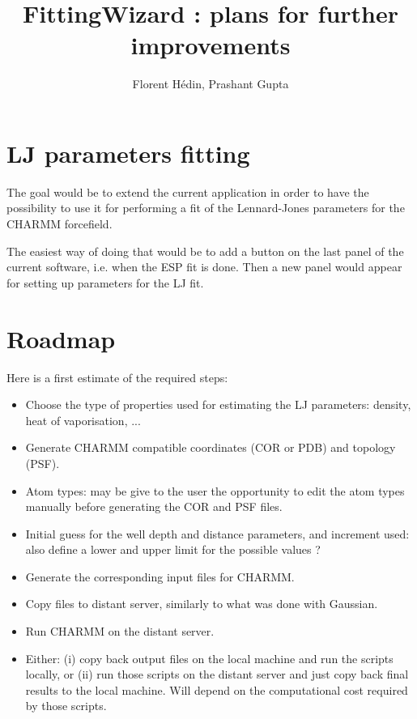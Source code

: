 \documentclass[12pt,a4paper]{article}
\author{Florent Hédin, Prashant Gupta}
\title{FittingWizard : plans for further improvements}
\begin{document}
\maketitle

\section{LJ parameters fitting}

The goal would be to extend the current application in order to have the
possibility to use it for performing a fit of the Lennard-Jones parameters for
the CHARMM forcefield.

\medskip

The easiest way of doing that would be to add a button on the last panel of the 
current software, i.e. when the ESP fit is done. Then a new panel would appear 
for setting up parameters for the LJ fit.

\section{Roadmap}

Here is a first estimate of the required steps:

\begin{itemize}
\item Choose the type of properties used for estimating the LJ parameters: 
density, heat of vaporisation, ...

\item Generate CHARMM compatible coordinates (COR or PDB) and topology (PSF).

\item Atom types: may be give to the user the opportunity to edit the atom 
types manually before generating the COR and PSF files.

\item Initial guess for the well depth and distance parameters, and increment 
used: also define a lower and upper limit for the possible values ?

\item Generate the corresponding input files for CHARMM.

\item Copy files to distant server, similarly to what was done with Gaussian.

\item Run CHARMM on the distant server.

\item Either: (i) copy back output files on the local machine and run the 
scripts locally, or (ii) run those scripts on the distant server and just copy 
back final results to the local machine. Will depend on the computational cost 
required by those scripts.

\end{itemize}
\end{document}
